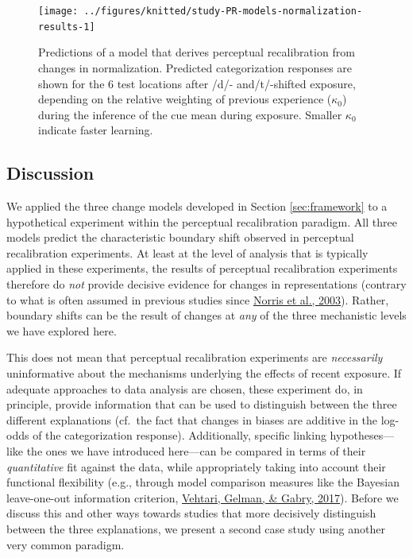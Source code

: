 \documentclass[
  11pt,
  english,
  man,floatsintext]{apa6}
\begin{document}
\begin{figure}

{\centering \texttt{[image: ../figures/knitted/study-PR-models-normalization-results-1]} 

}

\caption{Predictions of a model that derives perceptual recalibration from changes in normalization. Predicted categorization responses are shown for the 6 test locations after /d/- and/t/-shifted exposure, depending on the relative weighting of previous experience (\(\kappa_0\)) during the inference of the cue mean during exposure. Smaller \(\kappa_0\) indicate faster learning.}\label{fig:study-PR-models-normalization-results}
\end{figure}

\hypertarget{discussion}{%
\subsection{Discussion}\label{discussion}}

We applied the three change models developed in Section \ref{sec:framework} to a hypothetical experiment within the perceptual recalibration paradigm. All three models predict the characteristic boundary shift observed in perceptual recalibration experiments. At least at the level of analysis that is typically applied in these experiments, the results of perceptual recalibration experiments therefore do \emph{not} provide decisive evidence for changes in representations (contrary to what is often assumed in previous studies since \protect\hyperlink{ref-norris2003}{Norris et al., 2003}). Rather, boundary shifts can be the result of changes at \emph{any} of the three mechanistic levels we have explored here.

This does not mean that perceptual recalibration experiments are \emph{necessarily} uninformative about the mechanisms underlying the effects of recent exposure. If adequate approaches to data analysis are chosen, these experiment do, in principle, provide information that can be used to distinguish between the three different explanations (cf.~the fact that changes in biases are additive in the log-odds of the categorization response). Additionally, specific linking hypotheses---like the ones we have introduced here---can be compared in terms of their \emph{quantitative} fit against the data, while appropriately taking into account their functional flexibility (e.g., through model comparison measures like the Bayesian leave-one-out information criterion, \protect\hyperlink{ref-vehtari2017}{Vehtari, Gelman, \& Gabry, 2017}). Before we discuss this and other ways towards studies that more decisively distinguish between the three explanations, we present a second case study using another very common paradigm.
\end{document}
